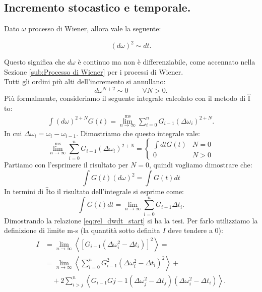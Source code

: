 \subsection{Incremento stocastico e temporale.}%
\label{sub:Relazione tra l'incremento stocastico e l'incremento temporale.}
Dato $\omega$ processo di Wiener, allora vale la seguente:
\begin{greenbox}{}
\[
    \left(d\omega\right)^2\sim dt
.\] 
\end{greenbox}
\noindent
Questo significa che $d\omega$  è continuo ma non è differenziabile, come accennato nella Sezione \ref{sub:Processo di Wiener} per i processi di Wiener.\\
Tutti gli ordini più alti dell'incremento si annullano:
\[
    d\omega^{N+2} \sim 0 \qquad \forall N>0
.\] 
Più formalmente, consideriamo il seguente integrale calcolato con il metodo di $\hat{\text{I}}$to:
\[\begin{aligned}
    \int\left(d\omega\right)^{2+N}G(t) = \lim^{\text{ms}}_{n \to \infty} \sum_{i=0}^{n} G_{i-1} (\Delta\omega_i)^{2+N} 
.\end{aligned}\]
In cui $\Delta\omega_i = \omega_i - \omega_{i-1}$. Dimostriamo che questo integrale vale:
\[
  \lim^{\text{ms}}_{n \to \infty} \sum_{i=0}^{n} G_{i-1} (\Delta\omega_i)^{2+N} = 
  \begin{cases}
      \int dtG(t) & N=0\\
      0          & N>0 
  \end{cases}
\] 
Partiamo con l'esprimere il risultato per $N = 0$, quindi vogliamo dimostrare che:
\begin{equation}
    \int G(t) \left(d\omega\right)^2 = \int G(t) dt
    \label{eq:rel_dwdt_start}
\end{equation}
In termini di $\hat{\text{I}}$to il risultato dell'integrale si esprime come: 
\[
    \int G(t) dt = \lim_{n \to \infty} \sum_{i = 0}^{n} G_{i-1} \Delta t_i
.\] 
Dimostrando la relazione \ref{eq:rel_dwdt_start} si ha la tesi. Per farlo utilizziamo la definizione di limite m-s (la quantità sotto definita $I$ deve tendere a $0$): 
\[\begin{aligned}
    I &= \lim_{n \to \infty} \left<\left[G_{i-1} \left(\Delta\omega_i^2 - \Delta t_i\right)\right]^2\right> = \\
      &= \lim_{n \to \infty} \left<\sum_{i = 0}^{n} G_{i-1}^2\left(\Delta\omega_i^2-\Delta t_i\right)^2\right> +  \\
      & \quad + 2 \sum_{i > j}^{n} \left<G_{i-1}G{j-1} \left(\Delta\omega^2_j-\Delta t_j\right)\left(\Delta\omega_i^2 - \Delta t_i\right)\right>
.\end{aligned}\]

